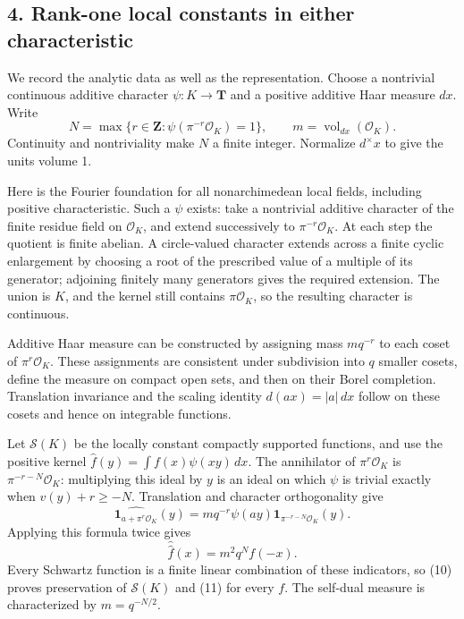 \documentclass[11pt,a4paper]{article}
\begin{document}
\subsection{4. Rank-one local constants in either
characteristic}\label{rank-one-local-constants-in-either-characteristic}

We record the analytic data as well as the representation. Choose a
nontrivial continuous additive character \(\psi:K\to\mathbf T\) and a
positive additive Haar measure \(dx\). Write \[
N=\max\{r\in\mathbf Z:\psi(\pi^{-r}\mathcal O_K)=1\},
\qquad m=\operatorname{vol}_{dx}(\mathcal O_K).
\tag{9}
\] Continuity and nontriviality make \(N\) a finite integer. Normalize
\(d^\times x\) to give the units volume 1.

Here is the Fourier foundation for all nonarchimedean local fields,
including positive characteristic. Such a \(\psi\) exists: take a
nontrivial additive character of the finite residue field on
\(\mathcal O_K\), and extend successively to \(\pi^{-r}\mathcal O_K\).
At each step the quotient is finite abelian. A circle-valued character
extends across a finite cyclic enlargement by choosing a root of the
prescribed value of a multiple of its generator; adjoining finitely many
generators gives the required extension. The union is \(K\), and the
kernel still contains \(\pi\mathcal O_K\), so the resulting character is
continuous.

Additive Haar measure can be constructed by assigning mass \(m q^{-r}\)
to each coset of \(\pi^r\mathcal O_K\). These assignments are consistent
under subdivision into \(q\) smaller cosets, define the measure on
compact open sets, and then on their Borel completion. Translation
invariance and the scaling identity \(d(ax)=|a|\,dx\) follow on these
cosets and hence on integrable functions.

Let \(\mathcal S(K)\) be the locally constant compactly supported
functions, and use the positive kernel
\(\widehat f(y)=\int f(x)\psi(xy)\,dx\). The annihilator of
\(\pi^r\mathcal O_K\) is \(\pi^{-r-N}\mathcal O_K\): multiplying this
ideal by \(y\) is an ideal on which \(\psi\) is trivial exactly when
\(v(y)+r\geq-N\). Translation and character orthogonality give \[
\widehat{\mathbf1_{a+\pi^r\mathcal O_K}}(y)
=m q^{-r}\psi(ay)\mathbf1_{\pi^{-r-N}\mathcal O_K}(y).
\tag{10}
\] Applying this formula twice gives \[
\widehat{\widehat f}(x)=m^2q^N f(-x).
\tag{11}
\] Every Schwartz function is a finite linear combination of these
indicators, so (10) proves preservation of \(\mathcal S(K)\) and (11)
for every \(f\). The self-dual measure is characterized by
\(m=q^{-N/2}\).
\end{document}
